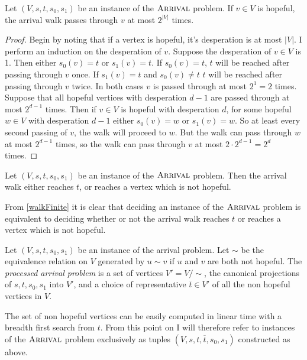 \begin{lemma}
  Let $(V, s, t, s_0, s_1)$  be an instance of the $\textsc{Arrival}$ problem. If $v \in V$ is hopeful,
  the arrival walk passes through $v$ at most $2^{|V|}$ times.
\end{lemma}
\begin{proof}
  Begin by noting that if a vertex is hopeful, it's desperation is at most $|V|$. I perform
  an induction on the desperation of $v$. Suppose the desperation of $v \in V$ is 1. Then either
  $s_0(v) = t$ or $s_1(v) = t$. If $s_0(v) = t$, $t$ will be reached after passing through $v$ once.
  If $s_1(v) = t$ and $s_0(v) \neq t$ $t$ will be reached after passing through $v$ twice. In
  both cases $v$ is passed through at most $2^1 = 2$ times. \\
  Suppose that all hopeful vertices with desperation $d - 1$ are passed through at most $2^{d-1}$ times.
  Then if $v \in V$ is hopeful with desperation $d$, for some hopeful $w \in V$ with desperation
  $d - 1$ either $s_0(v) = w$ or $s_1(v) = w$. So at least every second passing of $v$, the
  walk will proceed to $w$. But the walk can pass through $w$ at most $2^{d-1}$ times,
  so the walk can pass through $v$ at most $2 \cdot 2^{d - 1} = 2^d$ times.
\end{proof}
\begin{cor}\label{walkFinite}
  Let $(V, s, t, s_0, s_1)$ be an instance of the $\textsc{Arrival}$ problem. Then the arrival
  walk either reaches $t$, or reaches a vertex which is not hopeful.
\end{cor}
From \cref{walkFinite} it is clear that deciding an instance of the $\textsc{Arrival}$ problem is
equivalent to deciding whether or not the arrival walk reaches $t$ or reaches a vertex which
is not hopeful. 
\begin{definition}
  Let $(V, s, t, s_0, s_1)$ be an instance of the arrival problem. Let
  $\sim$ be the equivalence relation on $V$ generated by $u \sim v$ if
  $u$ and $v$ are both not hopeful.
  The \emph{processed arrival problem}
  is a set of vertices $V' = V / \sim$, the canonical projections of $s, t, s_0, s_1$ into $V'$,
  and a choice of representative $\overline{t} \in V'$ of all the non hopeful vertices in $V$.
\end{definition}
The set of non hopeful vertices can be easily computed in linear time with a breadth first search
from $t$. From this point on I will therefore refer
to instances of the $\textsc{Arrival}$ problem exclusively as tuples $(V, s, t, \overline{t}, s_0, s_1)$ 
constructed as above.

